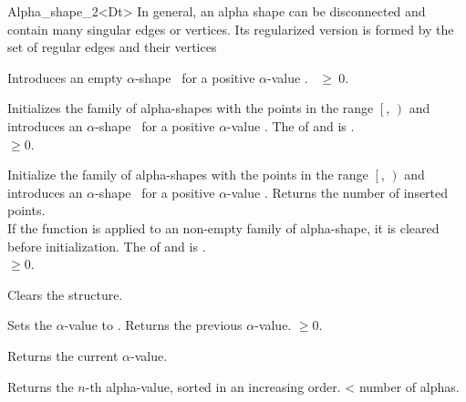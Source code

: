 \begin{ccClassTemplate} {Alpha_shape_2<Dt>}
{ In general, an alpha shape can be disconnected and contain many singular edges 
or vertices. Its regularized version is formed by the set of regular edges
and their vertices}

\ccCreation
{}

{Introduces an empty $\alpha$-shape \ccVar\ for a positive $\alpha$-value
 .
\ccPrecond {}~$\geq~0$.}


{Initializes the family of alpha-shapes with the points in the range
$\left[\right.$, $\left.\right)$ and 
introduces an $\alpha$-shape \ccVar\ for a positive $\alpha$-value
.  
\ccPrecond The  of  and
 is .\\
 $\geq 0$.}

\ccOperations

{Initialize the family of alpha-shapes with the points in the range
$\left[\right.$, $\left.\right)$ and 
introduces an $\alpha$-shape \ccVar\ for a positive $\alpha$-value
. Returns the number of inserted points. \\
If the function is applied to an non-empty family of alpha-shape, it is cleared
before initialization.
\ccPrecond The  of  and
 is .\\
 $\geq 0$.}

{Clears the structure.}

{Sets the $\alpha$-value to .
 Returns the previous $\alpha$-value.
\ccPrecond {} $\geq 0$.}

{Returns the current $\alpha$-value.}

{Returns the $n$-th alpha-value, sorted in an increasing order.
 \ccPrecond {} < number of alphas.}


\end{ccClassTemplate}
